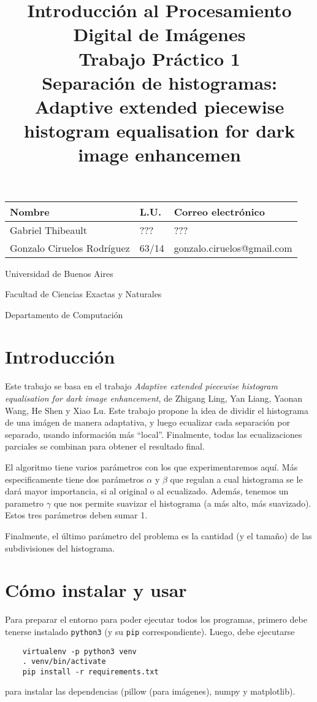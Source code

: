 \documentclass[11pt, spanish]{article}
\title{Introducción al Procesamiento Digital de Imágenes\\
Trabajo Práctico 1 \\
\large Separación de histogramas: \\
Adaptive extended piecewise histogram equalisation for dark image
enhancemen}
\date{}
\author{}
\begin{document}
\maketitle
\begin{center}
\begin{large}
\begin{tabular}{|l|l|l|}
 \hline
 \textbf{Nombre} & \textbf{L.U.} & \textbf{Correo electrónico} \\
 \hline
 Gabriel Thibeault & ??? & ??? \\
 \hline
 Gonzalo Ciruelos Rodríguez & 63/14 & gonzalo.ciruelos@gmail.com \\
 \hline
\end{tabular}
\end{large}
\end{center}

\vspace{10cm}

\large{
Universidad de Buenos Aires

Facultad de Ciencias Exactas y Naturales

Departamento de Computación
}
\newpage

\section{Introducción}
Este trabajo se basa en el trabajo
\emph{Adaptive extended piecewise histogram equalisation for dark image enhancement},
de Zhigang Ling, Yan Liang, Yaonan Wang, He Shen y Xiao Lu.
Este trabajo propone la idea de dividir el histograma de una imágen de manera adaptativa, y luego
ecualizar cada separación por separado, usando información más ``local''. Finalmente, todas
las ecualizaciones parciales se combinan para obtener el resultado final.

El algoritmo tiene varios parámetros con los que experimentaremos aquí. Más especificamente tiene dos parámetros
$\alpha$ y $\beta$ que regulan a cual histograma se le dará mayor importancia, si al original o al ecualizado.
Además, tenemos un parametro $\gamma$ que nos permite suavizar el histograma (a más alto, más suavizado). Estos tres
parámetros deben sumar 1.

Finalmente, el último parámetro del problema es la cantidad (y el tamaño) de las subdivisiones del histograma.

\section{Cómo instalar y usar}
Para preparar el entorno para poder ejecutar todos los programas,
primero debe tenerse instalado \texttt{python3} (y su \texttt{pip} correspondiente).
Luego, debe ejecutarse 
\begin{verbatim}
    virtualenv -p python3 venv 
    . venv/bin/activate
    pip install -r requirements.txt 
\end{verbatim}
\noindent para instalar las dependencias (pillow (para imágenes), numpy y matplotlib).
\end{document}
